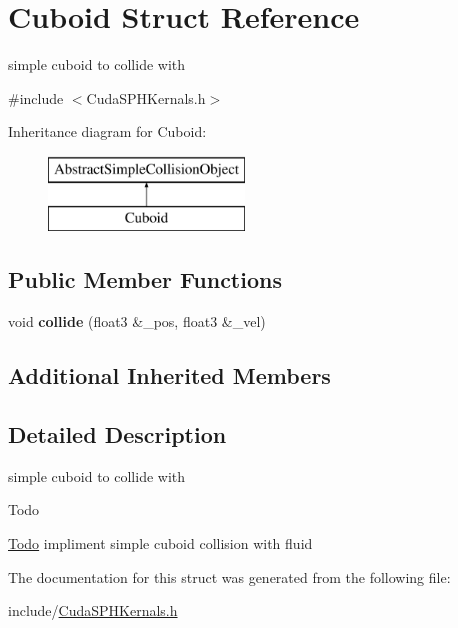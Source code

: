 \hypertarget{struct_cuboid}{\section{Cuboid Struct Reference}
\label{struct_cuboid}
}


simple cuboid to collide with  




{\ttfamily \#include $<$Cuda\-S\-P\-H\-Kernals.\-h$>$}

Inheritance diagram for Cuboid\-:\begin{figure}[H]
\begin{center}
\leavevmode
\includegraphics[height=2.000000cm]{struct_cuboid}
\end{center}
\end{figure}
\subsection*{Public Member Functions}
\begin{DoxyCompactItemize}
\item 
\hypertarget{struct_cuboid_a41ac5bd58351a5929f0b02fece4835ce}{void {\bfseries collide} (float3 \&\-\_\-pos, float3 \&\-\_\-vel)}\label{struct_cuboid_a41ac5bd58351a5929f0b02fece4835ce}

\end{DoxyCompactItemize}
\subsection*{Additional Inherited Members}


\subsection{Detailed Description}
simple cuboid to collide with 

\begin{DoxyRefDesc}{Todo}
\item[\hyperlink{todo__todo000001}{Todo}]impliment simple cuboid collision with fluid \end{DoxyRefDesc}


The documentation for this struct was generated from the following file\-:\begin{DoxyCompactItemize}
\item 
include/\hyperlink{_cuda_s_p_h_kernals_8h}{Cuda\-S\-P\-H\-Kernals.\-h}\end{DoxyCompactItemize}
